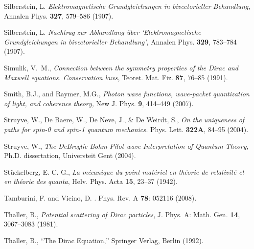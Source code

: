 \documentclass[12pt]{article}
\theoremstyle{definition}
\numberwithin{equation}{section}
\begin{document}
\begin{thebibliography}{[KTZ2020]}
        Silberstein, L.
       {\it Elektromagnetische Grundgleichungen in bivectorieller Behandlung},
       Annalen Phys. \textbf{327}, 579--586  (1907). \vspace{-4pt}

        Silberstein, L.
      {\it Nachtrag zur Abhandlung \"uber `Elektromagnetische Grundgleichungen in bivectorieller Behandlung'},
       Annalen Phys. \textbf{329}, 783--784 (1907). \vspace{-4pt}

        Simulik, V.~M.,
       \textit{Connection between the symmetry properties of the Dirac and Maxwell equations. Conservation laws},
       Teoret. Mat. Fiz. \textbf{87}, 76--85 (1991).\vspace{-4pt}

  Smith, B.J., 
  and 
  Raymer, M.G.,
  \textit{Photon wave functions, wave-packet quantization of light, and coherence theory,} 
  New J. Phys. \textbf{9}, 414--449 (2007). \vspace{-4pt} %

\! Struyve, W., De Baere, W., De Neve, J., \& De Weirdt, S.,
\textit{On the uniqueness of paths for spin-0 and spin-1 quantum mechanics.}
 Phys. Lett. \textbf{322A}, 84--95 (2004).\vspace{-4pt}

Struyve, W.,
\textit{The DeBroglie-Bohm Pilot-wave Interpretation of Quantum Theory},
Ph.D. dissertation, Universteit Gent (2004).

St\"uckelberg, E. C. G.,
  \textit{La m\'ecanique du point mat\'eriel en th\'eorie de relativit\'e et en th\'eorie des quanta},
  {Helv. Phys. Acta} \textbf{15}, {23--37} (1942).\vspace{-4pt}

 Tamburini, F. and Vicino, D.
 .
 \newblock Phys. Rev. A {\bf 78}: 052116 (2008).\vspace{-4pt}

Thaller, B.,
  \textit{Potential scattering of {D}irac particles},
  {J. Phys. A: Math. Gen.} \textbf{14}, 3067--3083 (1981).\vspace{-4pt}

  Thaller, B.,
  ``The Dirac Equation,''
  Springer Verlag, Berlin (1992).\vspace{-4pt}


\end{thebibliography}
\end{document}
